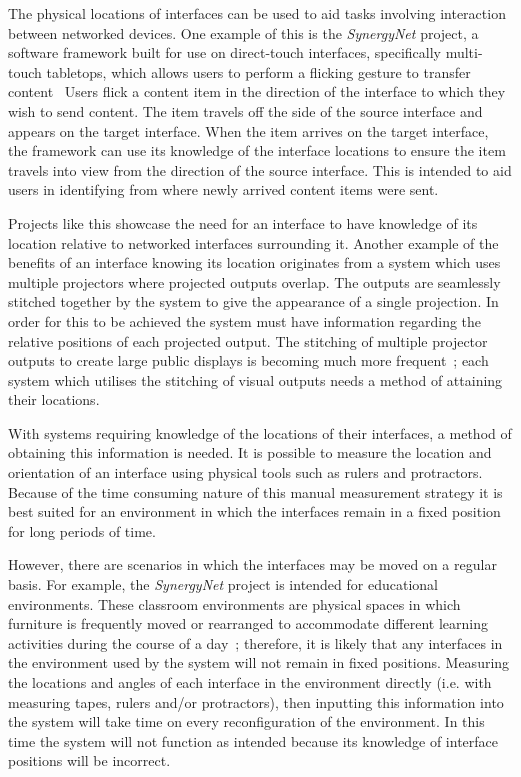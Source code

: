 \documentclass{bmcart}
\begin{document}
The physical locations of interfaces can be used to aid tasks involving interaction between networked devices.
One example of this is the {\emph{SynergyNet}} project, a software framework built for use on direct-touch interfaces, specifically multi-touch tabletops, which allows users to perform a flicking gesture to transfer content~\cite{McNaughton2017}
Users flick a content item in the direction of the interface to which they wish to send content.
The item travels off the side of the source interface and appears on the target interface.
When the item arrives on the target interface, the framework can use its knowledge of the interface locations to ensure the item travels into view from the direction of the source interface.
This is intended to aid users in identifying from where newly arrived content items were sent.

Projects like this showcase the need for an interface to have knowledge of its location relative to networked interfaces surrounding it.
Another example of the benefits of an interface knowing its location originates from a system which uses multiple projectors where projected outputs overlap.
The outputs are seamlessly stitched together by the system to give the appearance of a single projection.
In order for this to be achieved the system must have information regarding the relative positions of each projected output.
The stitching of multiple projector outputs to create large public displays is becoming much more frequent~\cite{Jones2011}; each system which utilises the stitching of visual outputs needs a method of attaining their locations.

With systems requiring knowledge of the locations of their interfaces, a method of obtaining this information is needed.
It is possible to measure the location and orientation of an interface using physical tools such as rulers and protractors. 
Because of the time consuming nature of this manual measurement strategy it is best suited for an environment in which the interfaces remain in a fixed position for long periods of time.

However, there are scenarios in which the interfaces may be moved on a regular basis.
For example, the {\emph{SynergyNet}} project is intended for educational environments.
These classroom environments are physical spaces in which furniture is frequently moved or rearranged to accommodate different learning activities during the course of a day~\cite{Tiburcio2005}; therefore, it is likely that any interfaces in the environment used by the system will not remain in fixed positions.
Measuring the locations and angles of each interface in the environment directly (i.e. with measuring tapes, rulers and/or protractors), then inputting this information into the system will take time on every reconfiguration of the environment.
In this time the system will not function as intended because its knowledge of interface positions will be incorrect.
\end{document}
